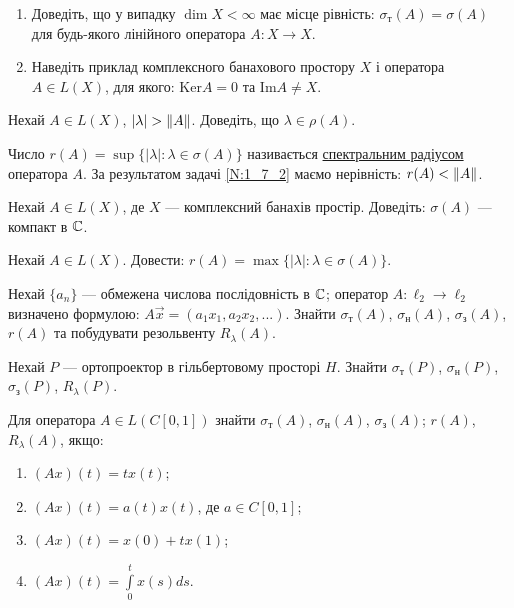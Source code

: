 \begin{exercise}
    \begin{enumerate}
        \item Доведіть, що у випадку $\dim X < \infty$ має місце рівність: 
        $\sigma_\text{т}(A) = \sigma(A)$ для будь-якого лінійного оператора 
        $A: X \rightarrow X$.
        \item Наведіть приклад комплексного банахового простору $X$ і 
        оператора $A \in L(X)$, для якого: $\mathrm{Ker} A = {0}$ та $\mathrm{Im} A \neq X$.
    \end{enumerate}
\end{exercise}

\begin{exercise}\label{N:1_7_2}
    Нехай $A \in L(X)$, $|\lambda| > \left\lVert A\right\rVert$. Доведіть, що $\lambda \in 
    \rho(A)$.
\end{exercise}

\begin{theory}
    Число $r(A) = \sup\{|\lambda| : \lambda \in \sigma(A)\}$ називається 
    \ul{спектральним радіусом} оператора $A$. За результатом задачі \ref{N:1_7_2} 
    маємо нерівність: $r(A) < \left\lVert A\right\rVert$.
\end{theory}

\begin{exercise}
    Нехай $A \in L(X)$, де $X$ --- комплексний банахів простір. Доведіть: 
    $\sigma(A)$ --- компакт в $\mathbb{C}$.
\end{exercise}

\begin{exercise}
    Нехай $A \in L(X)$. Довести: $r(A) = \max\{|\lambda| : \lambda \in \sigma(A)\}$.
\end{exercise}

\begin{exercise}
    Нехай $\{a_n\}$ --- обмежена числова послідовність в $\mathbb{C}$; оператор $A: \ell_2 
    \rightarrow \ell_2$ визначено формулою: $A\vec{x} = (a_1 x_1, a_2 x_2, ...)$. 
    Знайти $\sigma_\text{т}(A)$, $\sigma_\text{н}(A)$, $\sigma_\text{з}(A)$, $r(A)$ та 
    побудувати резольвенту $R_\lambda (A)$.
\end{exercise}

\begin{exercise}
    Нехай $P$ --- ортопроектор в гільбертовому просторі $H$. Знайти 
    $\sigma_\text{т}(P)$, $\sigma_\text{н}(P)$, $\sigma_\text{з}(P)$, $R_\lambda(P)$.
\end{exercise}

\begin{exercise}
    Для оператора $A \in L(C[0, 1])$ знайти 
    $\sigma_\text{т}(A)$, $\sigma_\text{н}(A)$, $\sigma_\text{з}(A)$; $r(A)$, $R_\lambda(A)$, 
    якщо:
    \begin{enumerate}
        \item $(Ax)(t) = tx(t)$;
        \item $(Ax)(t) = a(t)x(t)$, де $a \in C[0, 1]$;
        \item $(Ax)(t) = x(0) + tx(1)$;
        \item $(Ax)(t) = \int\limits_0^t x(s) ds$.
    \end{enumerate}
\end{exercise}

